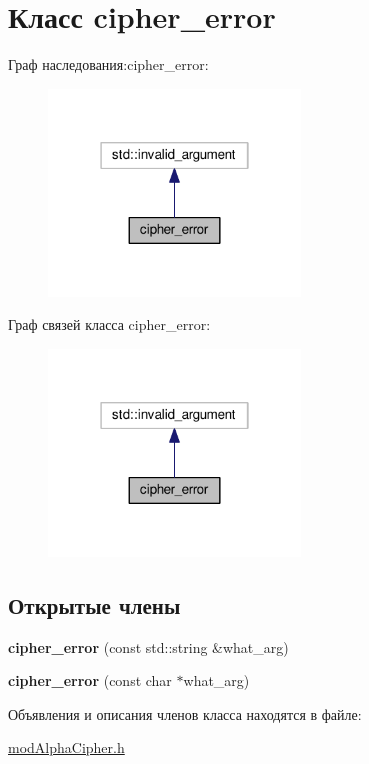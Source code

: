 \hypertarget{classcipher__error}{}\section{Класс cipher\+\_\+error}
\label{classcipher__error}


Граф наследования\+:cipher\+\_\+error\+:\nopagebreak
\begin{figure}[H]
\begin{center}
\leavevmode
\includegraphics[width=190pt]{classcipher__error__inherit__graph}
\end{center}
\end{figure}


Граф связей класса cipher\+\_\+error\+:\nopagebreak
\begin{figure}[H]
\begin{center}
\leavevmode
\includegraphics[width=190pt]{classcipher__error__coll__graph}
\end{center}
\end{figure}
\subsection*{Открытые члены}
\begin{DoxyCompactItemize}
\item 
{\bfseries cipher\+\_\+error} (const std\+::string \&what\+\_\+arg)\hypertarget{classcipher__error_aac662e216a84bfeb873303c7b88d029e}{}\label{classcipher__error_aac662e216a84bfeb873303c7b88d029e}

\item 
{\bfseries cipher\+\_\+error} (const char $\ast$what\+\_\+arg)\hypertarget{classcipher__error_a18cf27d9c2cd2538d3cb8f17e9a55f3e}{}\label{classcipher__error_a18cf27d9c2cd2538d3cb8f17e9a55f3e}

\end{DoxyCompactItemize}


Объявления и описания членов класса находятся в файле\+:\begin{DoxyCompactItemize}
\item 
\hyperlink{modAlphaCipher_8h}{mod\+Alpha\+Cipher.\+h}\end{DoxyCompactItemize}

